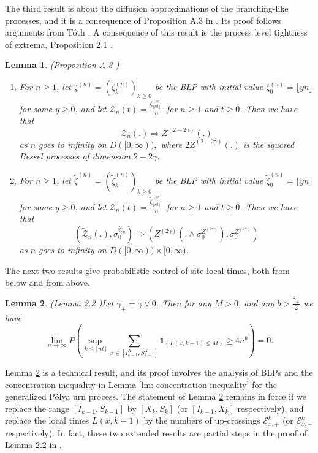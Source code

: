 \documentclass[twoside,12pt, a4paper]{article}
\newtheorem{lemma}{Lemma}[section]
\numberwithin{equation}{section}
\theoremstyle{remark}
\begin{document}
	The third result is about the diffusion approximations of the branching-like processes, and it is a consequence of Proposition A.3 in \cite{KMP23}. Its proof follows arguments from T\'{o}th \cite{T96}. A consequence of this result is the process level tightness of extrema, Proposition 2.1 \cite{KMP23}. 
	\begin{lemma}(Proposition A.3 \cite{KMP23})\label{lm: diffusion approximation of blp}
		\begin{enumerate}
			\item 
		For $n\geq 1$, let $\zeta^{(n)}=(\zeta^{(n)}_k)_{k\geq 0 }  $ be the BLP with initial value $\zeta^{(n)}_0 = \lfloor yn \rfloor$ for some $y \geq 0$, and let $\mathcal{Z}_n(t) = \frac{\zeta^{(n)}_{\lfloor nt \rfloor}}{n}$ for $n\geq 1$ and $t\geq 0$. Then we have that 
		\[
		\mathcal{Z}_n(.) \Longrightarrow Z^{(2-2\gamma)}(.)
		\] 
		as $n$ goes to infinity on $D([0,\infty)),$ where $2Z^{(2-2\gamma)}(.)$ is the squared Bessel processes of dimension $2-2\gamma$.

		\item
			For $n\geq 1$, let $\tilde\zeta^{(n)}=(\tilde\zeta^{(n)}_k)_{k\geq 0 }  $ be the BLP with initial value $\tilde\zeta^{(n)}_0 = \lfloor yn \rfloor$ for some $y \geq 0$, and let $\tilde{\mathcal{Z}}_n(t) = \frac{\tilde\zeta^{(n)}_{\lfloor nt \rfloor}}{n}$ for $n\geq 1$ and $t\geq 0$. Then we have that 
		\[
		\left(\tilde{\mathcal{Z}}_n(.), \sigma_0^{\tilde{\mathcal{Z}}_n}\right) 
		\Longrightarrow \left(Z^{(2\gamma)}(. \wedge \sigma_0^{Z^{(2 \gamma)}}), \sigma_0^{Z^{(2 \gamma)}}\right)
		\]
		as $n$ goes to infinity on $D([0,\infty)) \times [0,\infty )$.
		\end{enumerate}

	
	\end{lemma}
	
	
	The next two results give probabilistic control of site local times, both from below and from above.
	
	\begin{lemma}(Lemma 2.2 \cite{KMP23})\label{lm: number of rarely visit sites}
		Let $\gamma_+ = \gamma \vee 0$. Then for any $M>0$, and any $b>\frac{\gamma_+}{2}$ we have
		$$
		\lim_{n\to\infty} P\left(\sup_{k\leq\lfloor nt \rfloor}  \sum_{x\in [I^X_{k-1}, S^X_{k-1}]} \mathbb{1}_{\left\{ L(x,k-1) \leq M \right\}} \geq 4n^b \right) = 0.
		$$
		
	\end{lemma}	
	Lemma \ref{lm: number of rarely visit sites} is a technical result, and its proof involves the analysis of BLPs and the concentration inequality in Lemma \ref{lm: concentration inequality} for the generalized P\'{o}lya urn process. The statement of Lemma \ref{lm: number of rarely visit sites} remains in force if we replace the range $[I_{k-1}, S_{k-1}]$ by $[X_k,S_k]$ (or $[I_{k-1},X_k]$ respectively), and replace the local times $L(x,k-1)$ by the numbers of up-crossings $\mathcal{E}^{k}_{x,+}$ (or $\mathcal{E}^{k}_{x,-}$ respectively). In fact, these two extended results are partial steps in the proof of Lemma 2.2 in \cite{KMP23}.   
	
\end{document}
